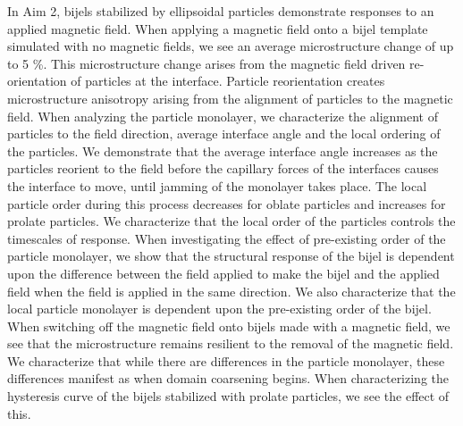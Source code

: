 In Aim 2, bijels stabilized by ellipsoidal particles demonstrate responses to an applied magnetic field. When applying a magnetic field
onto a bijel template simulated with no magnetic fields, we see an average microstructure change of up to 5 \%. This microstructure change
arises from the magnetic field driven re-orientation of particles at the interface. Particle reorientation creates microstructure anisotropy
arising from the alignment of particles to the magnetic field. When analyzing the particle monolayer, we characterize the alignment of particles
to the field direction, average interface angle and the local ordering of the particles. We demonstrate that the average interface angle increases
as the particles reorient to the field before the capillary forces of the interfaces causes the interface to move, until jamming of the monolayer takes
place. The local particle order during this process decreases for oblate particles and increases for prolate particles. We characterize that the local 
order of the particles controls the timescales of response.
When investigating the effect of pre-existing order of the particle monolayer, we show that the structural response of the bijel is dependent upon the
difference between the field applied to make the bijel and the applied field when the field is applied in the same direction. We also characterize that the
local particle monolayer is dependent upon the pre-existing order of the bijel. When switching off the magnetic field onto bijels made with a magnetic field,
we see that the microstructure remains resilient to the removal of the magnetic field. We characterize that while there are differences in the particle monolayer,
these differences manifest as when domain coarsening begins. When characterizing the hysteresis curve of the bijels stabilized with prolate particles,
we see the effect of this.

